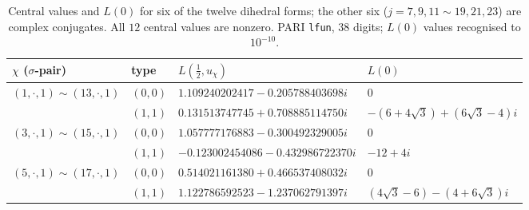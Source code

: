 \begin{table}[ht]\centering\small
\begin{tabular}{llll}\toprule
$\chi$ ($\sigma$-pair) & type & $L(\tfrac12,u_\chi)$ & $L(0)$\\\midrule
$(1,\cdot,1)\sim(13,\cdot,1)$ & $(0,0)$ & $1.109240202417-0.205788403698i$ & $0$\\
 & $(1,1)$ & $0.131513747745+0.708885114750i$ & $-(6+4\sqrt3)+(6\sqrt3-4)i$\\
$(3,\cdot,1)\sim(15,\cdot,1)$ & $(0,0)$ & $1.057777176883-0.300492329005i$ & $0$\\
 & $(1,1)$ & $-0.123002454086-0.432986722370i$ & $-12+4i$\\
$(5,\cdot,1)\sim(17,\cdot,1)$ & $(0,0)$ & $0.514021161380+0.466537408032i$ & $0$\\
 & $(1,1)$ & $1.122786592523-1.237062791397i$ & $(4\sqrt3-6)-(4+6\sqrt3)i$\\\bottomrule
\end{tabular}
\caption{Central values and $L(0)$ for six of the twelve dihedral forms; the other six ($j=7,9,11\sim19,21,23$) are complex conjugates.
All $12$ central values are nonzero. PARI \texttt{lfun}, 38 digits; $L(0)$ values recognised to $10^{-10}$.}\label{tab:L}
\end{table}

